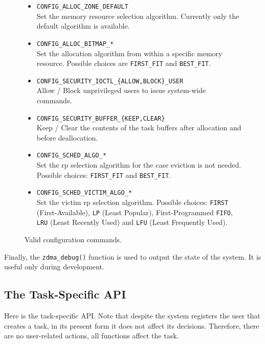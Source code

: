 \begin{figure}[b!]
\begin{itemize}
\item	\texttt{CONFIG\_ALLOC\_ZONE\_DEFAULT}\\
	Set the memory resource selection algorithm.
	Currently only the default algorithm is available.

\item	\texttt{CONFIG\_ALLOC\_BITMAP\_*}\\
	Set the allocation algorithm from within a specific memory resource.
	Possible choices are \texttt{FIRST\_FIT} and \texttt{BEST\_FIT}.

\item	\texttt{CONFIG\_SECURITY\_IOCTL\_\{ALLOW,BLOCK\}\_USER}\\
	Allow / Block unprivileged users to issue system-wide commands.

\item	\texttt{CONFIG\_SECURITY\_BUFFER\_\{KEEP,CLEAR\}}\\
	Keep / Clear the contents of the task buffers after allocation and before deallocation.

\item	\texttt{CONFIG\_SCHED\_ALGO\_*}\\
	Set the \gls{rp} selection algorithm for the case eviction is not needed.
	Possible choices: \texttt{FIRST\_FIT} and \texttt{BEST\_FIT}.

\item	\texttt{CONFIG\_SCHED\_VICTIM\_ALGO\_*}\\
	Set the victim \gls{rp} selection algorithm.
	Possible choices: \texttt{FIRST} (First-Available), \texttt{LP} (Least Popular),
	First-Programmed \texttt{FIFO}, \texttt{LRU} (Least Recently Used) and \texttt{LFU} (Least Frequently Used).
\end{itemize}
\caption{Valid configuration commands.}
\label{fig:config}
\end{figure}

Finally, the \texttt{zdma\_debug()} function is used to output the state of the system.
It is useful only during development.

\subsection{The Task-Specific API}
\label{sec:sw-api-task}

Here is the task-specific API. Note that despite the system registers the user
that creates a task, in its present form it does not affect its decisions.
Therefore, there are no user-related actions, all functions affect the task.

